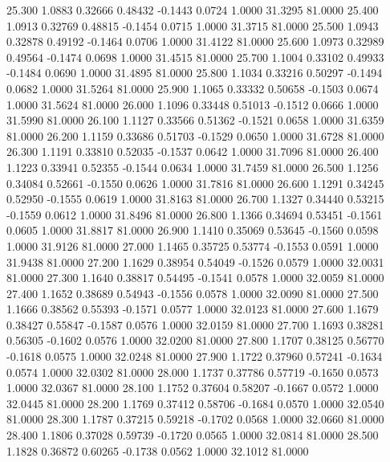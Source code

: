   25.300   1.0883   0.32666   0.48432  -0.1443   0.0724   1.0000  31.3295  81.0000
  25.400   1.0913   0.32769   0.48815  -0.1454   0.0715   1.0000  31.3715  81.0000
  25.500   1.0943   0.32878   0.49192  -0.1464   0.0706   1.0000  31.4122  81.0000
  25.600   1.0973   0.32989   0.49564  -0.1474   0.0698   1.0000  31.4515  81.0000
  25.700   1.1004   0.33102   0.49933  -0.1484   0.0690   1.0000  31.4895  81.0000
  25.800   1.1034   0.33216   0.50297  -0.1494   0.0682   1.0000  31.5264  81.0000
  25.900   1.1065   0.33332   0.50658  -0.1503   0.0674   1.0000  31.5624  81.0000
  26.000   1.1096   0.33448   0.51013  -0.1512   0.0666   1.0000  31.5990  81.0000
  26.100   1.1127   0.33566   0.51362  -0.1521   0.0658   1.0000  31.6359  81.0000
  26.200   1.1159   0.33686   0.51703  -0.1529   0.0650   1.0000  31.6728  81.0000
  26.300   1.1191   0.33810   0.52035  -0.1537   0.0642   1.0000  31.7096  81.0000
  26.400   1.1223   0.33941   0.52355  -0.1544   0.0634   1.0000  31.7459  81.0000
  26.500   1.1256   0.34084   0.52661  -0.1550   0.0626   1.0000  31.7816  81.0000
  26.600   1.1291   0.34245   0.52950  -0.1555   0.0619   1.0000  31.8163  81.0000
  26.700   1.1327   0.34440   0.53215  -0.1559   0.0612   1.0000  31.8496  81.0000
  26.800   1.1366   0.34694   0.53451  -0.1561   0.0605   1.0000  31.8817  81.0000
  26.900   1.1410   0.35069   0.53645  -0.1560   0.0598   1.0000  31.9126  81.0000
  27.000   1.1465   0.35725   0.53774  -0.1553   0.0591   1.0000  31.9438  81.0000
  27.200   1.1629   0.38954   0.54049  -0.1526   0.0579   1.0000  32.0031  81.0000
  27.300   1.1640   0.38817   0.54495  -0.1541   0.0578   1.0000  32.0059  81.0000
  27.400   1.1652   0.38689   0.54943  -0.1556   0.0578   1.0000  32.0090  81.0000
  27.500   1.1666   0.38562   0.55393  -0.1571   0.0577   1.0000  32.0123  81.0000
  27.600   1.1679   0.38427   0.55847  -0.1587   0.0576   1.0000  32.0159  81.0000
  27.700   1.1693   0.38281   0.56305  -0.1602   0.0576   1.0000  32.0200  81.0000
  27.800   1.1707   0.38125   0.56770  -0.1618   0.0575   1.0000  32.0248  81.0000
  27.900   1.1722   0.37960   0.57241  -0.1634   0.0574   1.0000  32.0302  81.0000
  28.000   1.1737   0.37786   0.57719  -0.1650   0.0573   1.0000  32.0367  81.0000
  28.100   1.1752   0.37604   0.58207  -0.1667   0.0572   1.0000  32.0445  81.0000
  28.200   1.1769   0.37412   0.58706  -0.1684   0.0570   1.0000  32.0540  81.0000
  28.300   1.1787   0.37215   0.59218  -0.1702   0.0568   1.0000  32.0660  81.0000
  28.400   1.1806   0.37028   0.59739  -0.1720   0.0565   1.0000  32.0814  81.0000
  28.500   1.1828   0.36872   0.60265  -0.1738   0.0562   1.0000  32.1012  81.0000
